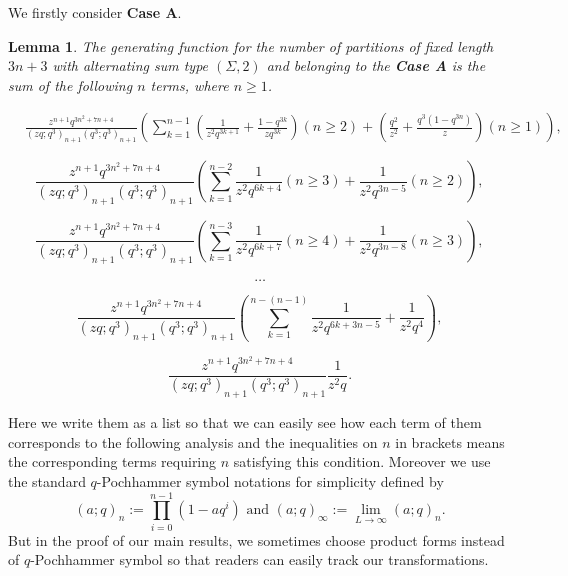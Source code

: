 \documentclass[draft]{amsart}
\numberwithin{equation}{section}
\theoremstyle{plain}
\newtheorem{lemma}[theorem]{Lemma}
\theoremstyle{remark}
\begin{document}
We firstly consider \textbf{Case A}.
\begin{lemma}\label{Lemma 3.4}%
 The generating function for the number of partitions of fixed length $3n+3$ with alternating sum type $(\Sigma, 2)$ and belonging to the {\textbf{Case A}} is the sum of the following $n$ terms, where $n\geq 1$.




\begin{align}\tag{0}\label{3.4-0}
&\frac{z^{n+1}q^{3n^{2}+7n+4}}{(zq;q^{3})_{n+1}(q^{3};q^{3})_{n+1}}\nonumber
\left( \sum_{k=1} ^{n-1}\left(\frac{1}{z^{2}q^{3k+1}}+\frac{1-q^{3k}}{zq^{3k}}\right)(n\geq2)+\left(\frac{q^{2}}{z^{2}}+\frac{q^{3}(1-q^{3n})}{z}\right)(n\geq 1)  \right)\nonumber,
\end{align}



\begin{equation}\tag{1}\label{3.4-1}
\frac{z^{n+1}q^{3n^{2}+7n+4}}{(zq;q^{3})_{n+1}(q^{3};q^{3})_{n+1}}\left( \sum_{k=1} ^{n-2}\frac{1}{z^{2}q^{6k+4}}(n\geq 3)+\frac{1}{z^{2}q^{3n-5}}(n\geq 2)\right),
\end{equation}



\begin{equation}\tag{2}
\frac{z^{n+1}q^{3n^{2}+7n+4}}{(zq;q^{3})_{n+1}(q^{3};q^{3})_{n+1}}\left( \sum_{k=1} ^{n-3}\frac{1}{z^{2}q^{6k+7}}(n\geq 4)+\frac{1}{z^{2}q^{3n-8}}(n\geq 3)\right),
\end{equation}

\begin{equation}\nonumber
\dots
\end{equation}


\begin{equation}\tag{n-2}
\frac{z^{n+1}q^{3n^{2}+7n+4}}{(zq;q^{3})_{n+1}(q^{3};q^{3})_{n+1}}\left( \sum_{k=1} ^{n-(n-1)}\frac{1}{z^{2}q^{6k+3n-5}}+\frac{1}{z^{2}q^{4}}\right),
\end{equation}

\begin{equation}\tag{n-1}\label{3.4-n-1}
\frac{z^{n+1}q^{3n^{2}+7n+4}}{(zq;q^{3})_{n+1}(q^{3};q^{3})_{n+1}}\frac{1}{z^{2}q^{}}.
\end{equation}

\end{lemma}
 Here we write them as a list  so that  we can easily see how each term of them corresponds to the following analysis and the inequalities on $n$ in brackets means the corresponding terms requiring $n$ satisfying  this condition. Moreover we use the standard $q$-Pochhammer symbol notations  for simplicity defined by 
 \begin{equation*}
(a;q)_n := \prod_{i=0}^{n-1} (1-aq^{i}) \text{  and  } (a;q)_\infty :=\lim_{L\rightarrow\infty} (a;q)_n.
\end{equation*}
But in the proof of our main results, we sometimes choose product forms instead of $q$-Pochhammer symbol so that readers can easily track our transformations.
\end{document}

